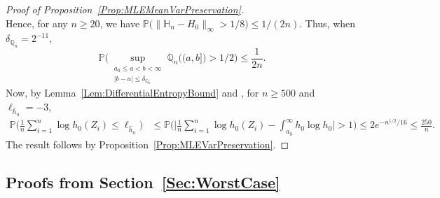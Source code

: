 \documentclass[a4paper,12pt]{article}
\begin{document}
\begin{proof}[Proof of Proposition~\ref{Prop:MLEMeanVarPreservation}]
\[\]
Hence, for any $n \geq 20$, we have $\mathbb{P}\bigl(\| \mathbb{H}_n - H_0 \|_{\infty} > 1/8\bigr) \leq 1/(2n)$. Thus, when $\delta_{\mathbb{Q}_n} = 2^{-11}$, 
\[
\mathbb{P}\Biggl(\sup_{\substack{a_0 \leq a < b < \infty \\ |b-a| \leq \delta_{\mathbb{Q}_n}}} \mathbb{Q}_n\bigl((a,b]\bigr) > 1/2\Biggr) \leq \frac{1}{2n}.
\]
Now, by Lemma~\ref{Lem:DifferentialEntropyBound} and \citet[][Theorem~1.1]{bobkov2011concentration}, for $n \geq 500$ and $\ell_{\hat{h}_n} = -3$,
  \begin{align*}
\mathbb{P}\biggl(\frac{1}{n} \sum_{i=1}^n \log h_0(Z_i) \leq \ell_{\hat{h}_n}\biggr) &\leq \mathbb{P}\biggl(\biggl|\frac{1}{n} \sum_{i=1}^n \log h_0(Z_i) - \int_{a_0}^\infty h_0 \log h_0\biggr| > 1\biggr) \leq 2e^{-n^{1/2}/16} \leq \frac{250}{n}.
  \end{align*}
The result follows by Proposition~\ref{Prop:MLEVarPreservation}.
\end{proof}

\subsection{Proofs from Section~\ref{Sec:WorstCase}}
\end{document}
